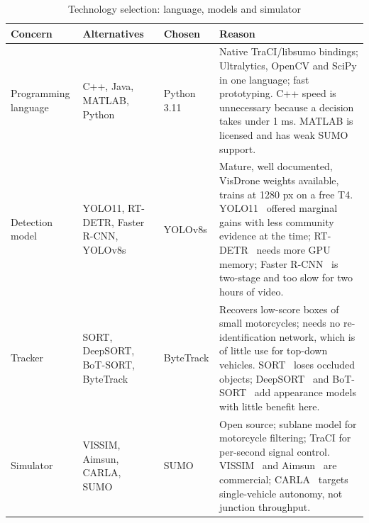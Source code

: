 \begin{table}[htbp]
\centering
\caption{Technology selection: language, models and simulator}\label{tab:impl-tech-core}
\small
\begin{tabularx}{\textwidth}{@{}>{\raggedright\arraybackslash}p{2.2cm}>{\raggedright\arraybackslash}p{3.1cm}>{\raggedright\arraybackslash}p{2.1cm}>{\raggedright\arraybackslash}X@{}}
\toprule
Concern & Alternatives & Chosen & Reason\\
\midrule
Programming language & C++, Java, MATLAB, Python & Python 3.11 & Native TraCI/libsumo bindings; Ultralytics, OpenCV and SciPy in one language; fast prototyping. C++ speed is unnecessary because a decision takes under 1 ms. MATLAB is licensed and has weak SUMO support.\\
Detection model & YOLO11, RT-DETR, Faster R-CNN, YOLOv8s & YOLOv8s & Mature, well documented, VisDrone weights available, trains at 1280 px on a free T4. YOLO11~\cite{jocher2024yolo11} offered marginal gains with less community evidence at the time; RT-DETR~\cite{zhao2024rtdetr} needs more GPU memory; Faster R-CNN~\cite{ren2015faster} is two-stage and too slow for two hours of video.\\
Tracker & SORT, DeepSORT, BoT-SORT, ByteTrack & ByteTrack & Recovers low-score boxes of small motorcycles; needs no re-identification network, which is of little use for top-down vehicles. SORT~\cite{bewley2016sort} loses occluded objects; DeepSORT~\cite{wojke2017deepsort} and BoT-SORT~\cite{aharon2022botsort} add appearance models with little benefit here.\\
Simulator & VISSIM, Aimsun, CARLA, SUMO & SUMO & Open source; sublane model for motorcycle filtering; TraCI for per-second signal control. VISSIM~\cite{fellendorf2010vissim} and Aimsun~\cite{casas2010aimsun} are commercial; CARLA~\cite{dosovitskiy2017carla} targets single-vehicle autonomy, not junction throughput.\\
\bottomrule
\end{tabularx}
\end{table}

